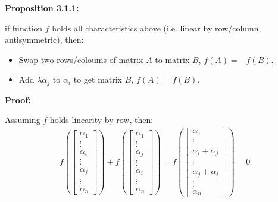 \documentclass{article}
\begin{document}
\vspace{2mm}
\textbf{Proposition 3.1.1:}

if function \(f\) holds all characteristics above (i.e. linear
by row/column, antisymmetric), then:

\begin{itemize}
    \item Swap two rows/coloums of matrix \(A\) to matrix \(B\),
    \(f(A)=-f(B)\).
    \item Add \(\lambda\alpha_j\) to \(\alpha_i\) to get matrix \(B\),
    \(f(A)=f(B)\).
\end{itemize}

\vspace{2mm}
\textbf{Proof:}

Assuming \(f\) holds linearity by row, then:
\begin{equation}
\begin{split}
f(
\begin{bmatrix}
    \alpha_1 \\
    \vdots \\
    \alpha_i \\
    \vdots \\
    \alpha_j \\
    \vdots \\
    \alpha_n
\end{bmatrix}) + 
f(\begin{bmatrix}
    \alpha_1 \\
    \vdots \\
    \alpha_j \\
    \vdots \\
    \alpha_i \\
    \vdots \\
    \alpha_n
\end{bmatrix})
=
f(\begin{bmatrix}
    \alpha_1 \\
    \vdots \\
    \alpha_i + \alpha_j \\
    \vdots \\
    \alpha_j + \alpha_i \\
    \vdots \\
    \alpha_n
\end{bmatrix})=0
\end{split}
\end{equation}
\end{document}
